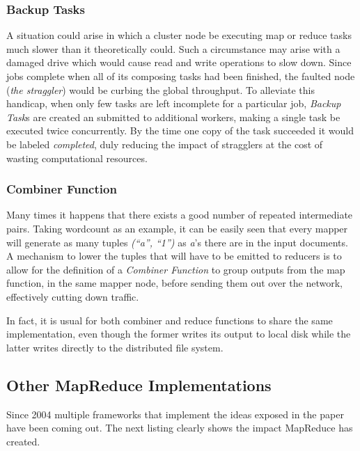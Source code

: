 \subsubsection{Backup Tasks}\label{subsubsec:secundarias}
\noindent A situation could arise in which a cluster node be executing map or reduce tasks much slower than it theoretically could. Such a circumstance may arise with a damaged drive which would cause read and write operations to slow down. Since jobs complete when all of its composing tasks had been finished, the faulted node (\emph{the straggler}) would be curbing the global throughput. To alleviate this handicap, when only few tasks are left incomplete for a particular job, \emph{Backup Task}s are created an submitted to additional workers, making a single task be executed twice concurrently. By the time one copy of the task succeeded it would be labeled \emph{completed}, duly reducing the impact of stragglers at the cost of wasting computational resources.

\subsubsection{Combiner Function}\label{subsubsec:combiner}

\noindent Many times it happens that there exists a good number of repeated intermediate pairs. Taking wordcount as an example, it can be easily seen that every mapper will generate as many tuples \emph{(``a'', ``1'')} as \emph{a}'s there are in the input documents. A mechanism to lower the tuples that will have to be emitted to reducers is to allow for the definition of a \emph{Combiner Function} to group outputs from the map function, in the same mapper node, before sending them out over the network, effectively cutting down traffic.

In fact, it is usual for both combiner and reduce functions to share the same implementation, even though the former writes its output to local disk while the latter writes directly to the distributed file system.

\subsection{Other MapReduce Implementations}\label{subsec:frameworksmapred}
\noindent Since 2004 multiple frameworks that implement the ideas exposed in the paper \cite{googlemapreduce} have been coming out. The next listing clearly shows the impact MapReduce has created.

